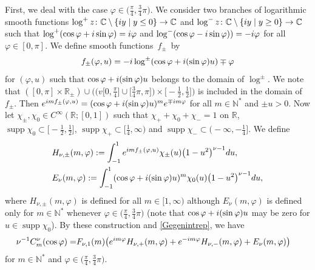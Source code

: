 \documentclass[10pt,a4paper]{article}
\numberwithin{equation}{section}
\def\R{\mathbb{R}}%
\DeclareMathOperator{\supp}{supp}%
\def\f{\varphi}
\def\n{\nu}
\begin{document}
First, we deal with the case $\f\in \bigl(\frac{\pi}{4}, \frac{3}{4}\pi\bigr)$.
We consider two branches of logarithmic smooth functions $\log^+z\colon\mathbb{C}\setminus \{{\rm i}y\mid y\leq 0\}\to \mathbb{C}$ and $\log^-z\colon\mathbb{C}\setminus \{{\rm i}y\mid y\geq 0\}\to \mathbb{C}$ such that $\log^+(\cos \f+{\rm i}\sin \f)={\rm i}\f$ and $\log^-(\cos\f-{\rm i}\sin\f))=-{\rm i}\f$ for all $\f\in [0,\pi]$. We define smooth functions~$f_{\pm}$~by
\begin{align*}
f_{\pm}(\f,u)=-{\rm i}\log^{\pm}(\cos\f+{\rm i}(\sin\f)u)\mp \f
\end{align*}
for $(\f,u)$ such that $\cos\f+{\rm i}(\sin\f)u$ belongs to the domain of $\log^{\pm}$. We note that
$([0,\pi]\times \R_{\pm})\cup \bigl(\bigl(v[0,\frac{\pi}{4}\bigr]\cup \bigl[\frac{3}{4}\pi,\pi\bigr]\bigr)\times \bigl[-\frac{1}{2},\frac{1}{2}\bigr] \bigr)$ is included in the domain of $f_{\pm}$.
Then ${\rm e}^{{\rm i}mf_{\pm}(\f,u)}=(\cos\f+{\rm i}(\sin\f)u)^m{\rm e}^{\mp {\rm i}m\f}$ for all $m\in\mathbb{N}^*$ and $\pm u>0$.
Now let $\chi_{\pm},\chi_0\in C^{\infty}(\R;[0,1])$ such that $\chi_++\chi_0+\chi_-=1$ on $\R$, $\supp\chi_0\subset \bigl[-\frac{1}{2},\frac{1}{2}\bigr]$, $\supp \chi_+\subset \bigl[\frac{1}{4},\infty\bigr)$ and $\supp\chi_-\subset \bigl(-\infty,-\frac{1}{4}\bigr]$. We define
\begin{align*}
&H_{\n,\pm}(m,\f):=\int_{-1}^1{\rm e}^{{\rm i}mf_{\pm}(\f,u)}\chi_{\pm}(u)\bigl(1-u^2\bigr)^{\n-1}{\rm d}u,\\
&E_{\n}(m,\f):=\int_{-1}^1(\cos \f+{\rm i}(\sin\f)u)^m\chi_{0}(u)\bigl(1-u^2\bigr)^{\n-1}{\rm d}u,
\end{align*}
where $H_{\n,\pm}(m,\f)$ is defined for all $m\in [1,\infty)$ although $E_{\n}(m,\f)$ is defined only for $m\in \mathbb{N}^*$ whenever $\f\in \bigl(\frac{\pi}{4}, \frac{3}{4}\pi\bigr)$ (note that $\cos\f+{\rm i}(\sin \f)u$ may be zero for $u\in \supp \chi_0$). By these construction and \eqref{Gegenintrep}, we have
\begin{align}\label{Gegendecom}
\n^{-1}C_m^{\n}(\cos\f)=&F_{\n,1}(m)\bigl({\rm e}^{{\rm i}m\f}H_{\n,+}(m,\f)+{\rm e}^{-{\rm i}m\f}H_{\n,-}(m,\f)+E_{\n}(m,\f) \bigr)
\end{align}
for $m\in\mathbb{N}^*$ and $\f\in \bigl(\frac{\pi}{4}, \frac{3}{4}\pi\bigr)$.
\end{document}
